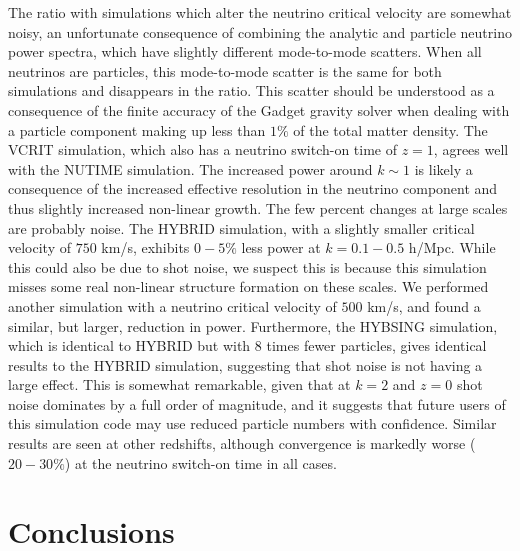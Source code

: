 \documentclass[useAMS, usenatbib]{mnras}
\begin{document}
The ratio with simulations which alter the neutrino critical velocity are somewhat noisy, an unfortunate consequence of combining the analytic and particle neutrino power spectra, which have slightly different mode-to-mode scatters. When all neutrinos are particles, this mode-to-mode scatter is the same for both simulations and disappears in the ratio. This scatter should be understood as a consequence of the finite accuracy of the Gadget gravity solver when dealing with a particle component making up less than $1\%$ of the total matter density. The VCRIT simulation, which also has a neutrino switch-on time of $z=1$, agrees well with the NUTIME simulation. The increased power around $k \sim 1$ is likely a consequence of the increased effective resolution in the neutrino component and thus slightly increased non-linear growth. The few percent changes at large scales are probably noise. The HYBRID simulation, with a slightly smaller critical velocity of $750$ km/s, exhibits $0-5\%$ less power at $k=0.1 - 0.5$ h/Mpc. While this could also be due to shot noise, we suspect this is because this simulation misses some real non-linear structure formation on these scales. We performed another simulation with a neutrino critical velocity of $500$ km/s, and found a similar, but larger, reduction in power. Furthermore, the HYBSING simulation, which is identical to HYBRID but with $8$ times fewer particles, gives identical results to the HYBRID simulation, suggesting that shot noise is not having a large effect. This is somewhat remarkable, given that at $k=2$ and $z=0$ shot noise dominates by a full order of magnitude, and it suggests that future users of this simulation code may use reduced particle numbers with confidence. Similar results are seen at other redshifts, although convergence is markedly worse ($20-30\%$) at the neutrino switch-on time in all cases.

\section{Conclusions}
\label{sec:conclusion}
\end{document}
